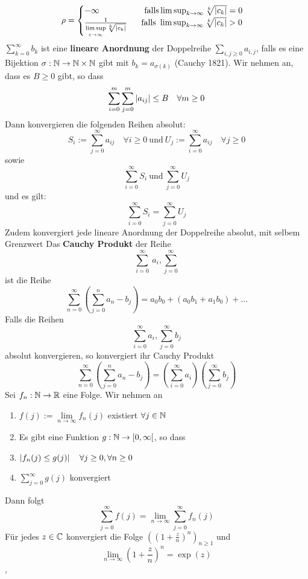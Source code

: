     \[\rho = \begin{cases}
        -\infty \quad \quad \quad \quad \quad \  \text{falls} \limsup_{k \rightarrow \infty} \sqrt[k]{\left\lvert c_k \right\rvert} = 0 \\
        \frac{1}{\limsup\limits_{c \rightarrow \infty} \sqrt[k]{\left|c_{k}\right|}}  \quad \  \ \text{falls } \limsup_{k \rightarrow \infty} \sqrt[k]{\left\lvert c_k \right\rvert} > 0
        \end{cases}\]
 \(\sum_{k=0}^{\infty} b_k \) ist eine \textbf{lineare Anordnung} der Doppelreihe \(\sum_{i,j \geq 0} a_{i,j}\), falls es eine Bijektion \(\sigma : \mathbb{N} \rightarrow \mathbb{N} \times \mathbb{N} \) gibt mit \(b_k = a_{\sigma(k)}\) \newline
{} (Cauchy 1821). Wir nehmen an, dass es \(B \geq 0\) gibt, so dass
\[\sum_{i=0}^{m}\sum_{j=0}^{m}\left\lvert a_{ij} \right\rvert \leq B \quad \forall m \geq 0\]
Dann konvergieren die folgenden Reihen absolut:
\[S_i := \sum_{j=0}^\infty a_{ij} \quad \forall i \geq 0 \  \text{und} \  U_j := \sum_{i=0}^{\infty}a_{ij} \quad \forall j \geq 0\]
sowie
\[\sum_{i=0}^\infty S_i \ \text{und} \ \sum_{j=0}^\infty U_j\]
und es gilt:
\[\sum_{i=0}^\infty S_i  =  \sum_{j=0}^\infty U_j\]
Zudem konvergiert jede lineare Anordnung der Doppelreihe absolut, mit selbem Grenzwert
 Das \textbf{Cauchy Produkt} der Reihe
\[\sum_{i=0}^\infty\ a_i, \sum_{j=0}^\infty\]
ist die Reihe
\[\sum_{n=0}^\infty ( \sum_{j=0}^n a_n-b_j )= a_0b_0 + (a_0b_1 + a_1b_0) + \dots \]
 Falls die Reihen
\[\sum_{i=0}^\infty a_i , \sum_{j=0}^\infty b_j\]
absolut konvergieren, so konvergiert ihr Cauchy Produkt
\[\sum_{n=0}^{\infty} (\sum_{j=0}^n a_n-b_j) = (\sum_{i=0}^{\infty} a_i) (\sum_{j=0}^{\infty} b_j)\]
  Sei \( f_n : \mathbb{N} \rightarrow \mathbb{R} \) eine Folge. Wir nehmen an
\begin{enumerate}
    \item [1] \(f(j) := \lim\limits_{n \rightarrow \infty} f_n(j)\) existiert \(\forall j \in \mathbb{N}\)
    \item [2] Es gibt eine Funktion \(g: \mathbb{N} \rightarrow [0, \infty[\), so dass
    \item [2.1] \(\left\lvert f_n(j) \leq g(j) \right\rvert \quad \forall j \geq 0, \forall n \geq 0\)
    \item [2.2] \(\sum_{j=0}^\infty g(j)\) konvergiert
\end{enumerate}
Dann folgt
\[\sum_{j=0}^\infty f(j) = \lim\limits_{n \rightarrow \infty} \sum_{j=0}^\infty f_n(j)\]
 Für jedes \(z \in \mathbb{C} \) konvergiert die Folge \(((1 + \frac{z}{n})^n)_{n \geq 1}\) und
\[\lim\limits_{n \rightarrow \infty} (1 + \frac{z}{n})^n = \exp(z)\]
\sep